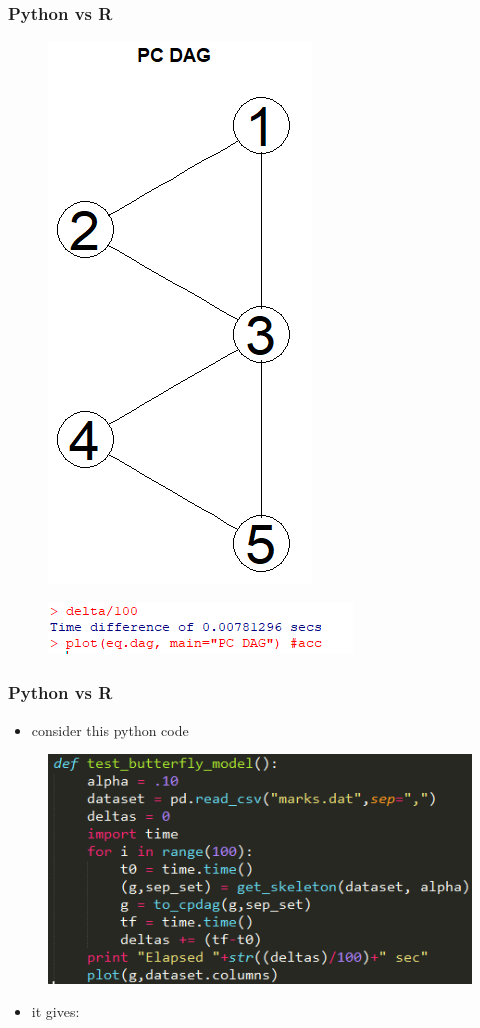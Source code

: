 \documentclass[xcolor ={table,usenames,dvipsnames}]{beamer}
\theoremstyle{definition}
\begin{document}
\begin{frame}
\frametitle{Python vs R}
\begin{figure}[h!]
	\centering
	\includegraphics[scale=0.35]{img/rdag.PNG}
\end{figure}
\begin{figure}[h!]
	\centering
	\includegraphics[scale=0.5]{img/rtime}
\end{figure}
\end{frame}
\begin{frame}
\frametitle{Python vs R}
\begin{itemize}
	\item consider this python code
	\end{itemize}
\begin{figure}[h!]
	\centering
	\includegraphics[scale=0.5]{img/py.PNG}
\end{figure}
\begin{itemize}
	\item it gives:
\end{itemize}
\end{frame}
\end{document}
